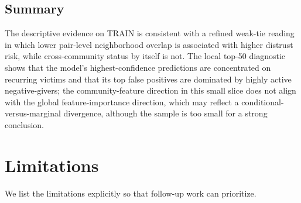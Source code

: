 \documentclass[conference]{IEEEtran}
\begin{document}
\subsection{Summary}

The descriptive evidence on TRAIN is consistent with a refined
weak-tie reading in which lower pair-level neighborhood overlap is
associated with higher distrust risk, while cross-community status by
itself is not. The local top-50 diagnostic shows that the model's
highest-confidence predictions are concentrated on recurring victims
and that its top false positives are dominated by highly active
negative-givers; the community-feature direction in this small slice
does not align with the global feature-importance direction, which may reflect a conditional-versus-marginal divergence, although the sample is too small for a strong conclusion.

\section{Limitations}\label{sec:lim}

We list the limitations explicitly so that follow-up work can
prioritize.
\end{document}
